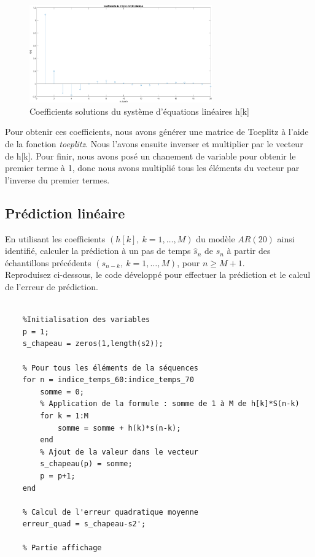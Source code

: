 \documentclass{article}
\begin{document}
\begin{figure}[!h]
    \centering
    \includegraphics[width=0.7\textwidth]{images/hk_solution.png}
    \caption{Coefficients solutions du système d'équations linéaires h[k]}
    \label{fig-binaire}
\end{figure}
Pour obtenir ces coefficients, nous avons générer une matrice de Toeplitz à l'aide de la fonction \textit{toeplitz}. Nous l'avons ensuite inverser et multiplier par le vecteur de h[k]. Pour finir, nous avons posé un chanement de variable pour obtenir le premier terme à 1, donc nous avons multiplié tous les éléments du vecteur par l'inverse du premier termes.
\clearpage

\subsection{Prédiction linéaire}
\label{sec:predlin}

En utilisant les coefficients $(h[k],~k=1,\ldots,M)$ du modèle $AR(20)$ ainsi identifié, calculer la prédiction à un pas de temps $\hat{s}_n$ de $s_n$ à partir des échantillons précédents $(s_{n-k},~k=1,\ldots,M)$, pour $n \geq M+1$.\\[1mm]
Reproduisez ci-dessous, le code développé pour effectuer la prédiction et le calcul de l'erreur de prédiction.
\begin{verbatim}

    %Initialisation des variables
    p = 1;
    s_chapeau = zeros(1,length(s2));
    
    % Pour tous les éléments de la séquences 
    for n = indice_temps_60:indice_temps_70
        somme = 0;
        % Application de la formule : somme de 1 à M de h[k]*S(n-k)
        for k = 1:M
            somme = somme + h(k)*s(n-k);
        end
        % Ajout de la valeur dans le vecteur
        s_chapeau(p) = somme;
        p = p+1;
    end
    
    % Calcul de l'erreur quadratique moyenne
    erreur_quad = s_chapeau-s2';
    
    % Partie affichage
\end{verbatim}
 
\end{document}
